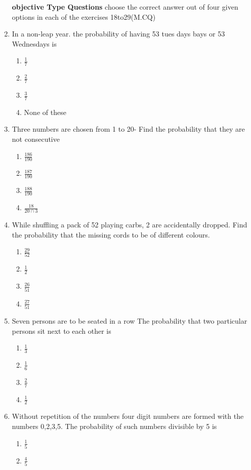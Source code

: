 \documentclass[12pt]{article}
\begin{document}
\begin{enumerate}
\begin{enumerate}
	\end{enumerate}
\textbf{objective Type Questions}
choose the correct answer out of four given options in each of the exercises 18to29(M.CQ)
\item In a non-leap year. the probability of having 53 tues days bays or 53 Wednesdays is
	\begin{enumerate}
\item $\frac{1}{7}$
\item $\frac{2}{7}$
\item $\frac{3}{7}$
\item None of these
	\end{enumerate}
\item Three numbers are chosen from 1 to 20- Find the probability that they are not consecutive
	\begin{enumerate}
\item $\frac{186}{190}$
\item $\frac{187}{190}$
\item $\frac{188}{190}$
\item $\frac{18}{20\cap3}$
	\end{enumerate}
\item While shuffling a pack of 52 playing carbs, 2 are accidentally dropped. Find the probability that the missing cords to be of different colours.
	\begin{enumerate}
\item $\frac{29}{52}$
\item $\frac{1}{2}$
\item $\frac{26}{51}$
\item $\frac{27}{51}$
	\end{enumerate}
\item Seven persons are to be seated in a row The probability that two particular persons sit next to each other is
	\begin{enumerate}
\item $\frac{1}{3}$
\item $\frac{1}{6}$
\item $\frac{2}{7}$
\item $\frac{1}{2}$
	\end{enumerate}
\item Without repetition of the numbers four digit numbers are formed with the numbers 0,2,3,5. The probability of such numbers divisible by 5 is
	\begin{enumerate}
\item $\frac{1}{5}$
\item $\frac{4}{5}$

\end{enumerate}
\end{enumerate}
\end{document}
